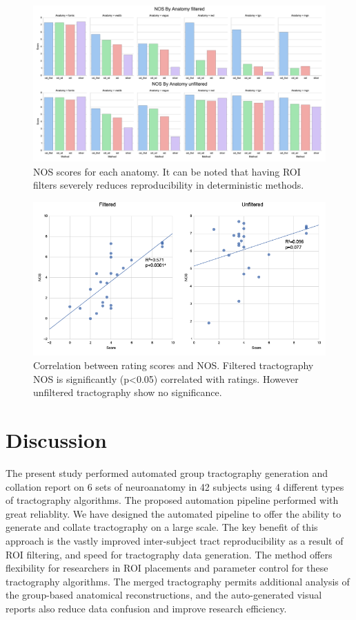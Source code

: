 \begin{figure}[ht]
\centering
\includegraphics[width=\textwidth]{figure6.png}
\caption{NOS scores for each anatomy. It can be noted that having ROI filters severely reduces reproducibility in deterministic methods.}
\label{fig:SGfigure6}
\end{figure}

\begin{figure}[ht]
\centering
\includegraphics[width=\textwidth]{figure7.png}
\caption{Correlation between rating scores and NOS. Filtered tractography NOS is significantly (p\textless 0.05) correlated with ratings. However unfiltered tractography show no significance.}
\label{fig:SGfigure7}
\end{figure}

\section{Discussion}

The present study performed automated group tractography generation and collation report on 6 sets of neuroanatomy in 42 subjects using 4 different types of tractography algorithms. The proposed automation pipeline performed with great reliablity. We have designed the automated pipeline to offer the ability to generate and collate tractography on a large scale. The key benefit of this approach is the vastly improved inter-subject tract reproducibility as a result of ROI filtering, and speed for tractography data generation. The method offers flexibility for researchers in ROI placements and parameter control for these tractography algorithms. The merged tractography permits additional analysis of the group-based anatomical reconstructions, and the auto-generated visual reports also reduce data confusion and improve research efficiency. 

